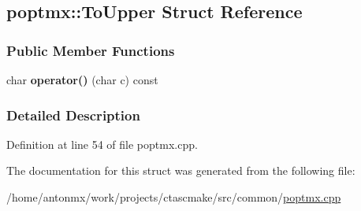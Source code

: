 \hypertarget{structpoptmx_1_1ToUpper}{
\subsection{poptmx::ToUpper Struct Reference}
\label{structpoptmx_1_1ToUpper}
}
\subsubsection*{Public Member Functions}
\begin{DoxyCompactItemize}
\item 
\hypertarget{structpoptmx_1_1ToUpper_a1d203ac56e40780abec8fd120953b496}{
char {\bfseries operator()} (char c) const }
\label{structpoptmx_1_1ToUpper_a1d203ac56e40780abec8fd120953b496}

\end{DoxyCompactItemize}


\subsubsection{Detailed Description}


Definition at line 54 of file poptmx.cpp.



The documentation for this struct was generated from the following file:\begin{DoxyCompactItemize}
\item 
/home/antonmx/work/projects/ctascmake/src/common/\hyperlink{poptmx_8cpp}{poptmx.cpp}\end{DoxyCompactItemize}
